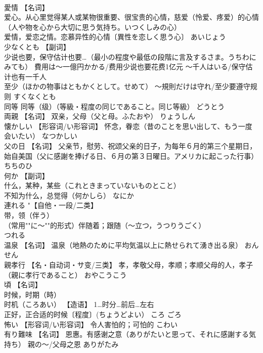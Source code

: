 \documentclass[8pt]{extreport}
\begin{document}
\begin{CJK}{UTF8}{min}
\\	愛情	【名词】 
\\	爱心。从心里觉得某人或某物很重要、很宝贵的心情，慈爱（怜爱、疼爱）的心情（人や物を心から大切に思う気持ち。いつくしみの心） 
\\	爱情，爱恋之情。恋慕异性的心情〔異性を恋しく思う心〕	あいじょう	
\\	少なくとも	【副词】 
\\	少说也要，保守估计也要…（最小の程度や最低の段階に言及するさま。うちわにみても） 費用は〜一億円かかる/费用少说也要花费1亿元 〜千人はいる/保守估计也有一千人 
\\	至少（ほかの物事はともかくとして。せめて） 〜規則だけは守れ/至少要遵守规则	すくなくとも	
\\	同等	同等（级）（等級・程度の同じであること。同じ等級）	どうとう	
\\	両親	【名词】 双亲，父母（父と母。ふたおや）	りょうしん	
\\	懐かしい	【形容词/い形容词】 怀念，眷恋（昔のことを思い出して、もう一度会いたい）	なつかしい	
\\	父の日	【名词】 父亲节，慰劳、祝颂父亲的日子，为每年６月的第三个星期日，始自美国（父に感謝を捧げる日、６月の第３日曜日。アメリカに起こった行事）	ちちのひ	
\\	何か	【副词】 
\\	什么，某种，某些（これときまっていないものとこと） 
\\	不知为什么，总觉得（何かしら）	なにか	
\\	連れる	"【自他・一段/二类】 
\\	带，领（伴う） 
\\	（常用""に〜""的形式）伴随着；跟随（〜立つ，うつりうごく）
\\	つれる	
\\	温泉	【名词】 温泉（地熱のために平均気温以上に熱せられて湧き出る泉）	おんせん	
\\	親孝行	【名・自动词・サ变/三类】 孝，孝敬父母，孝顺；孝顺父母的人，孝子（親に孝行であること）	おやこうこう	
\\	頃	【名词】 
\\	时候，时期（時） 
\\	时机（ころあい） 【造语】 1…时分…前后…左右 
\\	正好，正合适的时候〔程度〕(ちょうどよい）	ころ ごろ	
\\	怖い	【形容词/い形容词】 令人害怕的；可怕的	こわい	
\\	有り難味	【名词】 恩惠。有感谢之意（ありがたいと思って、それに感謝する気持ち） 親の〜/父母之恩	ありがたみ	

\end{CJK}
\end{document}
